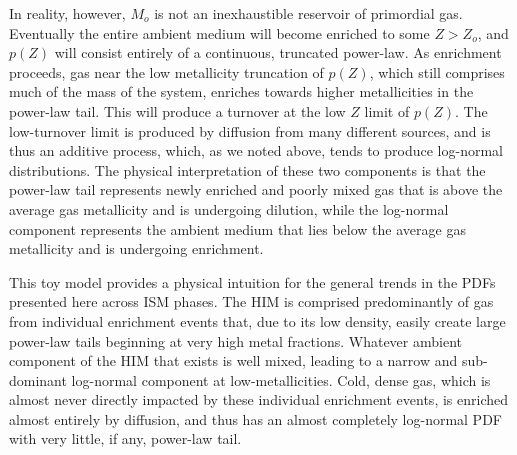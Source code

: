 \documentclass[twocolumn]{aastex61}
\begin{document}
In reality, however, $M_o$ is not an inexhaustible reservoir of primordial gas. Eventually the entire ambient medium will become enriched to some $Z > Z_o$, and $p(Z)$ will consist entirely of a continuous, truncated power-law. As enrichment proceeds, gas near the low metallicity truncation of $p(Z)$, which still comprises much of the mass of the system, enriches towards higher metallicities in the power-law tail. This will produce a turnover at the low $Z$ limit of $p(Z)$. The low-turnover limit is produced by diffusion from many different sources, and is thus an additive process, which, as we noted above, tends to produce log-normal distributions. The physical interpretation of these two components is that the power-law tail represents newly enriched and poorly mixed gas that is above the average gas metallicity and is undergoing dilution, while the log-normal component represents the ambient medium that lies below the average gas metallicity and is undergoing enrichment.

This toy model provides a physical intuition for the general trends in the PDFs presented here across ISM phases. The HIM is comprised predominantly of gas from individual enrichment events that, due to its low density, easily create large power-law tails beginning at very high metal fractions. Whatever ambient component of the HIM that exists is well mixed, leading to a narrow and sub-dominant log-normal component at low-metallicities. Cold, dense gas, which is almost never directly impacted by these individual enrichment events, is enriched almost entirely by diffusion, and thus has an almost completely log-normal PDF with very little, if any, power-law tail.

%
%
%
\end{document}
